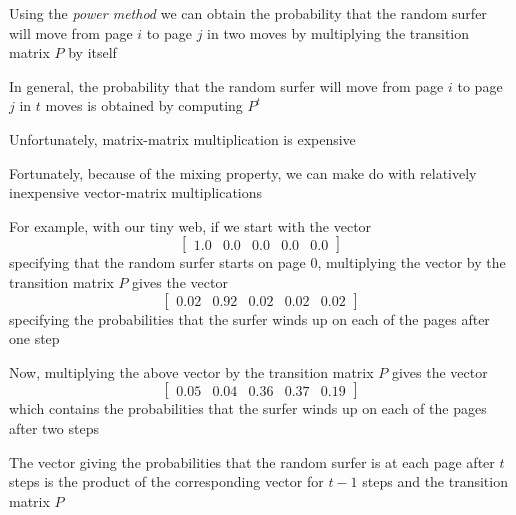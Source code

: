 \documentclass[8pt,a4paper,compress]{beamer}
\begin{document}
\begin{frame}[fragile]
Using the \emph{power method} we can obtain the probability that the random surfer will move from page $i$ to page $j$ in two moves by multiplying the transition matrix $P$ by itself

\bigskip

In general, the probability that the random surfer will move from page $i$ to page $j$ in $t$ moves is obtained by computing $P^t$ 

\bigskip 

Unfortunately, matrix-matrix multiplication is expensive

\bigskip

Fortunately, because of the mixing property, we can make do with relatively inexpensive vector-matrix multiplications
\end{frame}

\begin{frame}[fragile]
For example, with our tiny web, if we start with the vector 
\[
\begin{bmatrix}
1.0 & 0.0 & 0.0 & 0.0 & 0.0
\end{bmatrix}
\]
specifying that the random surfer starts on page 0, multiplying the vector by the transition matrix $P$ gives the vector 
\[
\begin{bmatrix}
0.02 & 0.92 & 0.02 & 0.02 & 0.02
\end{bmatrix}
\]
specifying the probabilities that the surfer winds up on each of the pages after one step

\bigskip

Now, multiplying the above vector by the transition matrix $P$ gives the vector
\[
\begin{bmatrix}
0.05 & 0.04 & 0.36 & 0.37 & 0.19
\end{bmatrix}
\]
which contains the probabilities that the surfer winds up on each of the pages after two steps

\bigskip

The vector giving the probabilities that the random surfer is at each page after $t$ steps is the product of the corresponding vector for $t-1$ steps and the transition matrix $P$
\end{frame}
\end{document}
